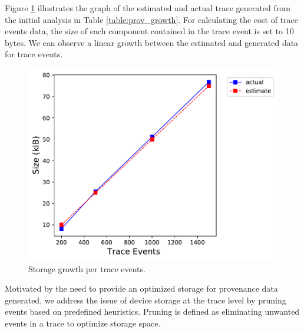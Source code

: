 Figure \ref{fig:prov_trace} illustrates the graph of the estimated and actual trace generated from the initial analysis in Table \ref{table:prov_growth}. For calculating the cost of trace events data, the size of each component contained in the trace event is set to 10 bytes. We can observe a linear growth between the estimated and generated data for trace events. 


% 
%


\begin{figure}[tbh!]
\begin{center}
\includegraphics[width=.6\textwidth]{output_prov_trace.pdf}
\end{center}
\caption{Storage growth per trace events. }
\label{fig:prov_trace}
\end{figure}






Motivated by the need to provide an optimized storage for provenance data generated, we address the issue of device storage at the trace level by pruning events based on predefined heuristics. Pruning is defined as eliminating unwanted events in a trace to optimize storage space. %


